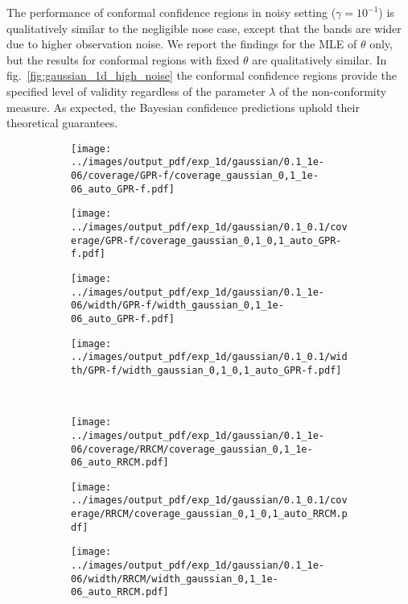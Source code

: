 \documentclass[conference]{IEEEtran}
\begin{document}
The performance of conformal confidence regions in noisy setting ($\gamma=10^{-1}$)
is qualitatively similar to the negligible nose case, except that the bands are wider
due to higher observation noise. We report the findings for the MLE of $\theta$ only,
but the results for conformal regions with fixed $\theta$ are qualitatively similar.
In fig.~\ref{fig:gaussian_1d_high_noise} the conformal confidence regions provide the
specified level of validity regardless of the parameter $\lambda$ of the non-conformity
measure. As expected, the Bayesian confidence predictions uphold their theoretical
guarantees.

\begin{figure}%
  \centering
  \begin{subfigure}[b]{0.25\linewidth}
    \texttt{[image: ../images/output\_pdf/exp\_1d/gaussian/0.1\_1e-06/coverage/GPR-f/coverage\_gaussian\_0,1\_1e-06\_auto\_GPR-f.pdf]}
  \end{subfigure}%
  \begin{subfigure}[b]{0.25\linewidth}
    \texttt{[image: ../images/output\_pdf/exp\_1d/gaussian/0.1\_0.1/coverage/GPR-f/coverage\_gaussian\_0,1\_0,1\_auto\_GPR-f.pdf]}
  \end{subfigure}%
    \begin{subfigure}[b]{0.25\linewidth}
    \texttt{[image: ../images/output\_pdf/exp\_1d/gaussian/0.1\_1e-06/width/GPR-f/width\_gaussian\_0,1\_1e-06\_auto\_GPR-f.pdf]}
  \end{subfigure}%
  \begin{subfigure}[b]{0.25\linewidth}
    \texttt{[image: ../images/output\_pdf/exp\_1d/gaussian/0.1\_0.1/width/GPR-f/width\_gaussian\_0,1\_0,1\_auto\_GPR-f.pdf]}
  \end{subfigure}\\
  \begin{subfigure}[b]{0.25\linewidth}
    \texttt{[image: ../images/output\_pdf/exp\_1d/gaussian/0.1\_1e-06/coverage/RRCM/coverage\_gaussian\_0,1\_1e-06\_auto\_RRCM.pdf]}
  \end{subfigure}%
  \begin{subfigure}[b]{0.25\linewidth}
    \texttt{[image: ../images/output\_pdf/exp\_1d/gaussian/0.1\_0.1/coverage/RRCM/coverage\_gaussian\_0,1\_0,1\_auto\_RRCM.pdf]}
  \end{subfigure}%
  \begin{subfigure}[b]{0.25\linewidth}
    \texttt{[image: ../images/output\_pdf/exp\_1d/gaussian/0.1\_1e-06/width/RRCM/width\_gaussian\_0,1\_1e-06\_auto\_RRCM.pdf]}

\end{subfigure}
\end{figure}
\end{document}
